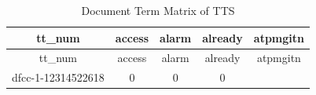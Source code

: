 \documentclass[]{article}
\begin{document}
\begin{longtable}[c]{@{}ccccc@{}}
\caption{Document Term Matrix of TTS}\tabularnewline
\toprule
\begin{minipage}[b]{0.23\columnwidth}\centering\strut
tt\_num
\strut\end{minipage} &
\begin{minipage}[b]{0.11\columnwidth}\centering\strut
access
\strut\end{minipage} &
\begin{minipage}[b]{0.10\columnwidth}\centering\strut
alarm
\strut\end{minipage} &
\begin{minipage}[b]{0.12\columnwidth}\centering\strut
already
\strut\end{minipage} &
\begin{minipage}[b]{0.12\columnwidth}\centering\strut
atpmgitn
\strut\end{minipage}\tabularnewline
\midrule
\endfirsthead
\toprule
\begin{minipage}[b]{0.23\columnwidth}\centering\strut
tt\_num
\strut\end{minipage} &
\begin{minipage}[b]{0.11\columnwidth}\centering\strut
access
\strut\end{minipage} &
\begin{minipage}[b]{0.10\columnwidth}\centering\strut
alarm
\strut\end{minipage} &
\begin{minipage}[b]{0.12\columnwidth}\centering\strut
already
\strut\end{minipage} &
\begin{minipage}[b]{0.12\columnwidth}\centering\strut
atpmgitn
\strut\end{minipage}\tabularnewline
\midrule
\endhead
\begin{minipage}[t]{0.23\columnwidth}\centering\strut
dfcc-1-12314522618
\strut\end{minipage} &
\begin{minipage}[t]{0.11\columnwidth}\centering\strut
0
\strut\end{minipage} &
\begin{minipage}[t]{0.10\columnwidth}\centering\strut
0
\strut\end{minipage} &
\begin{minipage}[t]{0.12\columnwidth}\centering\strut
0
\strut\end{minipage} &
\begin{minipage}[t]{0.12\columnwidth}\centering\strut

\end{minipage}
\end{longtable}
\end{document}
